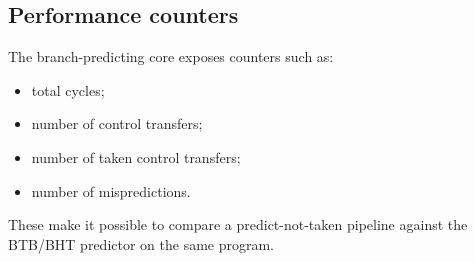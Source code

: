 \subsection{Performance counters}

The branch-predicting core exposes counters such as:

\begin{itemize}
\item total cycles;
\item number of control transfers;
\item number of taken control transfers;
\item number of mispredictions.
\end{itemize}
These make it possible to compare a predict-not-taken pipeline against the BTB/BHT predictor on the same program.

\bigskip
